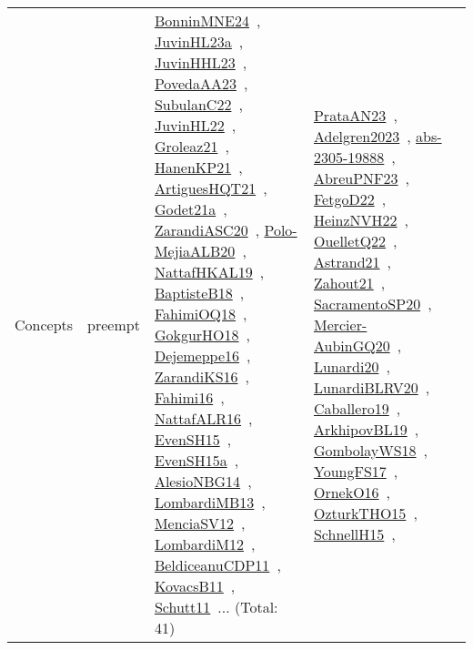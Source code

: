 {\begin{longtable}{lp{3cm}>{\raggedright\arraybackslash}p{6cm}>{\raggedright\arraybackslash}p{6cm}>{\raggedright\arraybackslash}p{8cm}}
Concepts & preempt & \href{../works/BonninMNE24.pdf}{BonninMNE24}~\cite{BonninMNE24}, \href{../works/JuvinHL23a.pdf}{JuvinHL23a}~\cite{JuvinHL23a}, \href{../works/JuvinHHL23.pdf}{JuvinHHL23}~\cite{JuvinHHL23}, \href{../works/PovedaAA23.pdf}{PovedaAA23}~\cite{PovedaAA23}, \href{../works/SubulanC22.pdf}{SubulanC22}~\cite{SubulanC22}, \href{../works/JuvinHL22.pdf}{JuvinHL22}~\cite{JuvinHL22}, \href{../works/Groleaz21.pdf}{Groleaz21}~\cite{Groleaz21}, \href{../works/HanenKP21.pdf}{HanenKP21}~\cite{HanenKP21}, \href{../works/ArtiguesHQT21.pdf}{ArtiguesHQT21}~\cite{ArtiguesHQT21}, \href{../works/Godet21a.pdf}{Godet21a}~\cite{Godet21a}, \href{../works/ZarandiASC20.pdf}{ZarandiASC20}~\cite{ZarandiASC20}, \href{../works/Polo-MejiaALB20.pdf}{Polo-MejiaALB20}~\cite{Polo-MejiaALB20}, \href{../works/NattafHKAL19.pdf}{NattafHKAL19}~\cite{NattafHKAL19}, \href{../works/BaptisteB18.pdf}{BaptisteB18}~\cite{BaptisteB18}, \href{../works/FahimiOQ18.pdf}{FahimiOQ18}~\cite{FahimiOQ18}, \href{../works/GokgurHO18.pdf}{GokgurHO18}~\cite{GokgurHO18}, \href{../works/Dejemeppe16.pdf}{Dejemeppe16}~\cite{Dejemeppe16}, \href{../works/ZarandiKS16.pdf}{ZarandiKS16}~\cite{ZarandiKS16}, \href{../works/Fahimi16.pdf}{Fahimi16}~\cite{Fahimi16}, \href{../works/NattafALR16.pdf}{NattafALR16}~\cite{NattafALR16}, \href{../works/EvenSH15.pdf}{EvenSH15}~\cite{EvenSH15}, \href{../works/EvenSH15a.pdf}{EvenSH15a}~\cite{EvenSH15a}, \href{../works/AlesioNBG14.pdf}{AlesioNBG14}~\cite{AlesioNBG14}, \href{../works/LombardiMB13.pdf}{LombardiMB13}~\cite{LombardiMB13}, \href{../works/MenciaSV12.pdf}{MenciaSV12}~\cite{MenciaSV12}, \href{../works/LombardiM12.pdf}{LombardiM12}~\cite{LombardiM12}, \href{../works/BeldiceanuCDP11.pdf}{BeldiceanuCDP11}~\cite{BeldiceanuCDP11}, \href{../works/KovacsB11.pdf}{KovacsB11}~\cite{KovacsB11}, \href{../works/Schutt11.pdf}{Schutt11}~\cite{Schutt11}... (Total: 41) & \href{../works/PrataAN23.pdf}{PrataAN23}~\cite{PrataAN23}, \href{../works/Adelgren2023.pdf}{Adelgren2023}~\cite{Adelgren2023}, \href{../works/abs-2305-19888.pdf}{abs-2305-19888}~\cite{abs-2305-19888}, \href{../works/AbreuPNF23.pdf}{AbreuPNF23}~\cite{AbreuPNF23}, \href{../works/FetgoD22.pdf}{FetgoD22}~\cite{FetgoD22}, \href{../works/HeinzNVH22.pdf}{HeinzNVH22}~\cite{HeinzNVH22}, \href{../works/OuelletQ22.pdf}{OuelletQ22}~\cite{OuelletQ22}, \href{../works/Astrand21.pdf}{Astrand21}~\cite{Astrand21}, \href{../works/Zahout21.pdf}{Zahout21}~\cite{Zahout21}, \href{../works/SacramentoSP20.pdf}{SacramentoSP20}~\cite{SacramentoSP20}, \href{../works/Mercier-AubinGQ20.pdf}{Mercier-AubinGQ20}~\cite{Mercier-AubinGQ20}, \href{../works/Lunardi20.pdf}{Lunardi20}~\cite{Lunardi20}, \href{../works/LunardiBLRV20.pdf}{LunardiBLRV20}~\cite{LunardiBLRV20}, \href{../works/Caballero19.pdf}{Caballero19}~\cite{Caballero19}, \href{../works/ArkhipovBL19.pdf}{ArkhipovBL19}~\cite{ArkhipovBL19}, \href{../works/GombolayWS18.pdf}{GombolayWS18}~\cite{GombolayWS18}, \href{../works/YoungFS17.pdf}{YoungFS17}~\cite{YoungFS17}, \href{../works/OrnekO16.pdf}{OrnekO16}~\cite{OrnekO16}, \href{../works/OzturkTHO15.pdf}{OzturkTHO15}~\cite{OzturkTHO15}, \href{../works/SchnellH15.pdf}{SchnellH15}~\cite{SchnellH15}, 
\end{longtable}}
